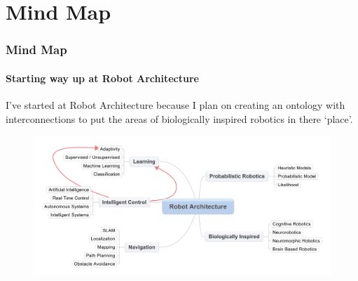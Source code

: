 \section{Mind Map}

\begin{frame}
    \frametitle{Mind Map}
    \framesubtitle{Starting way up at Robot Architecture}
	I've started at Robot Architecture because I plan on creating an ontology with interconnections to put the areas of biologically inspired robotics in there `place'. 
	\begin{figure}[tbp]
  	\centering
  	\includegraphics[width=1\textwidth]{./sections/robot_mindmap.pdf}
	\end{figure}    
    
\end{frame}